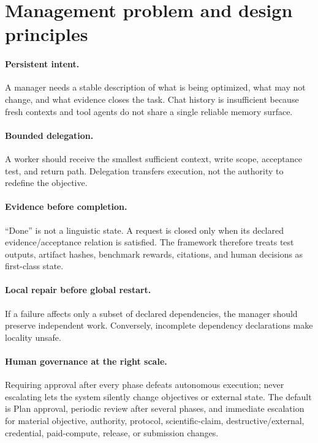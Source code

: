 \documentclass{article}
\begin{document}
\section{Management problem and design principles}
\paragraph{Persistent intent.} A manager needs a stable description of what is being optimized, what may not change, and what evidence closes the task. Chat history is insufficient because fresh contexts and tool agents do not share a single reliable memory surface.

\paragraph{Bounded delegation.} A worker should receive the smallest sufficient context, write scope, acceptance test, and return path. Delegation transfers execution, not the authority to redefine the objective.

\paragraph{Evidence before completion.} ``Done'' is not a linguistic state. A request is closed only when its declared evidence/acceptance relation is satisfied. The framework therefore treats test outputs, artifact hashes, benchmark rewards, citations, and human decisions as first-class state.

\paragraph{Local repair before global restart.} If a failure affects only a subset of declared dependencies, the manager should preserve independent work. Conversely, incomplete dependency declarations make locality unsafe.

\paragraph{Human governance at the right scale.} Requiring approval after every phase defeats autonomous execution; never escalating lets the system silently change objectives or external state. The default is Plan approval, periodic review after several phases, and immediate escalation for material objective, authority, protocol, scientific-claim, destructive/external, credential, paid-compute, release, or submission changes.
\end{document}

